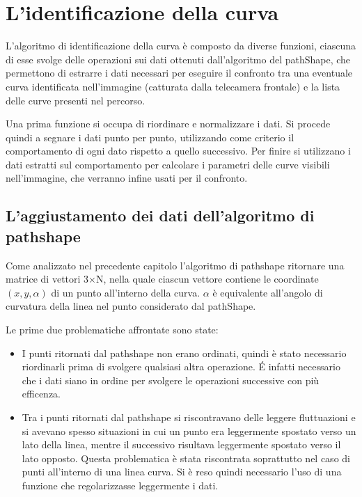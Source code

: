 \chapter{L'identificazione della curva}
L'algoritmo di identificazione della curva è composto da diverse funzioni, ciascuna di esse svolge delle operazioni sui dati ottenuti dall'algoritmo del pathShape, che permettono di estrarre i dati necessari per eseguire il confronto tra una eventuale curva identificata nell'immagine (catturata dalla telecamera frontale) e la lista delle curve presenti nel percorso.

Una prima funzione si occupa di riordinare e normalizzare i dati. Si procede quindi a segnare i dati punto per punto, utilizzando come criterio il comportamento di ogni dato rispetto a quello successivo. Per finire si utilizzano i dati estratti sul comportamento per calcolare i parametri delle curve visibili nell'immagine, che verranno infine usati per il confronto.

\section{L'aggiustamento dei dati dell'algoritmo di pathshape}

    Come analizzato nel precedente capitolo l'algoritmo di pathshape ritornare una matrice di vettori 3$\times$N, nella quale ciascun vettore contiene le coordinate $(x, y, \alpha)$ di un punto all'interno della curva. $\alpha$ è equivalente all'angolo di curvatura della linea nel punto considerato dal pathShape.

Le prime due problematiche affrontate sono state:
\begin{itemize}
    \item I punti ritornati dal pathshape non erano ordinati, quindi è stato necessario riordinarli prima di svolgere qualsiasi altra operazione. \'E infatti necessario che i dati siano in ordine per svolgere le operazioni successive con più efficenza.
    \item Tra i punti ritornati dal pathshape si riscontravano delle leggere fluttuazioni e si avevano spesso situazioni in cui un punto era leggermente spostato verso un lato della linea, mentre il successivo risultava leggermente spostato verso il lato opposto. Questa problematica è stata riscontrata soprattutto nel caso di punti all'interno di una linea curva. Si è reso quindi necessario l'uso di una funzione che regolarizzasse leggermente i dati.
\end{itemize}

